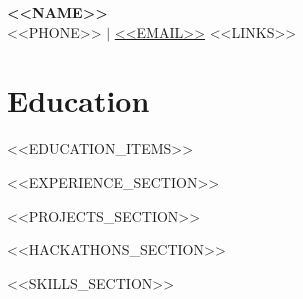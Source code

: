 \documentclass[letterpaper,11pt]{article}
\newcommand{\resumeSubHeadingListStart}{\begin{itemize}[leftmargin=0.15in, label={}]}
\newcommand{\resumeSubHeadingListEnd}{\end{itemize}}
\begin{document}
\begin{center}
    \textbf{\Huge \scshape <<NAME>>} \\ \vspace{1pt}
    \small <<PHONE>> $|$ \href{mailto:<<EMAIL>>}{<<EMAIL>>} <<LINKS>>
\end{center}

\section{Education}
  \resumeSubHeadingListStart
<<EDUCATION_ITEMS>>
  \resumeSubHeadingListEnd

<<EXPERIENCE_SECTION>>

<<PROJECTS_SECTION>>

<<HACKATHONS_SECTION>>

<<SKILLS_SECTION>>
\end{document}
